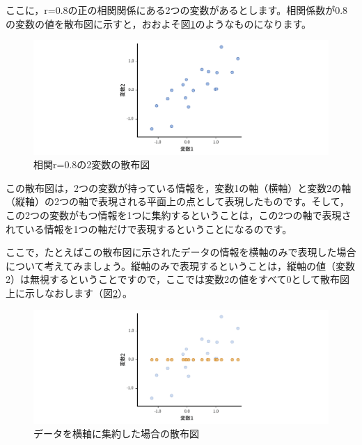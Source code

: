 \documentclass[
  12pt,
  a5jpaper,
  lualatex, ja=standard]{bxjsbook}
\begin{document}
ここに，r=0.8の正の相関関係にある2つの変数があるとします。相関係数が0.8の変数の値を散布図に示すと，おおよそ図\ref{fig:factor-pca-scatter1}のようなものになります。

\begin{figure}[!ht]

{\centering \includegraphics[width=1\linewidth]{images/factor/pca-scatter1} 

}

\caption{相関r=0.8の2変数の散布図}\label{fig:factor-pca-scatter1}
\end{figure}

この散布図は，2つの変数が持っている情報を，変数1の軸（横軸）と変数2の軸（縦軸）の2つの軸で表現される平面上の点として表現したものです。そして，この2つの変数がもつ情報を1つに集約するということは，この2つの軸で表現されている情報を1つの軸だけで表現するということになるのです。

ここで，たとえばこの散布図に示されたデータの情報を横軸のみで表現した場合について考えてみましょう。縦軸のみで表現するということは，縦軸の値（変数2）は無視するということですので，ここでは変数2の値をすべて0として散布図上に示しなおします（図\ref{fig:factor-pca-scatter2}）。

\begin{figure}[!ht]

{\centering \includegraphics[width=1\linewidth]{images/factor/pca-scatter2} 

}

\caption{データを横軸に集約した場合の散布図}\label{fig:factor-pca-scatter2}
\end{figure}
\end{document}
